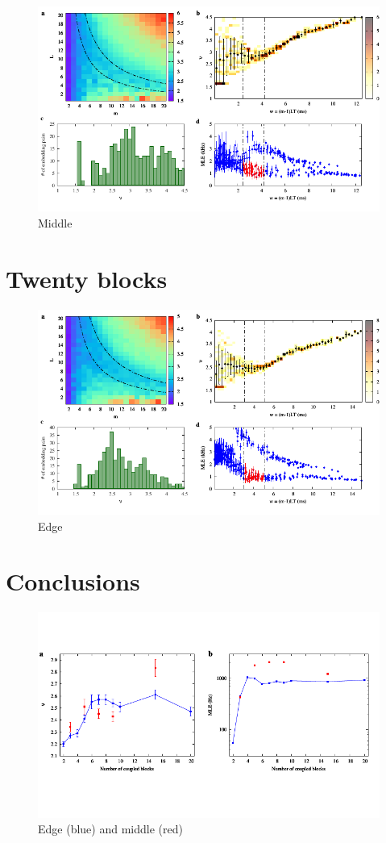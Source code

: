 \begin{figure}[H]
    \centering
    \includegraphics[width=\linewidth]{../15_blocks/middle/2e5_points/plots/chaos_low.pdf}
    \caption{Middle}
    \label{fig:15 blocks middle chaos}
\end{figure}

\section{Twenty blocks}

\begin{figure}[H]
    \centering
    \includegraphics[width=\linewidth]{../20_blocks/2e5_points/plots/chaos_low.pdf}
    \caption{Edge}
    \label{fig:20 blocks chaos}
\end{figure}

\section{Conclusions}

\begin{figure}[H]
    \centering
    \includegraphics[width=\linewidth,trim={0 1.5cm 0 1.3cm},clip]
    {../data/nu_mle_blocks.pdf}
    \caption{Edge (blue) and middle (red)}
    \label{fig:nu mle blocks}
\end{figure}

